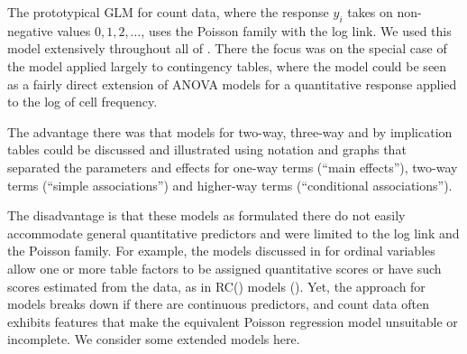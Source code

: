 \documentclass[11pt]{book}\usepackage[]{graphicx}\usepackage[]{color}
\begin{document}

The prototypical GLM for count data, where the response $y_i$
takes on non-negative values $0, 1, 2, \dots$,
uses the Poisson family with the log link.
We used this model extensively throughout all of .
There the focus was on the special case of the \loglin model
applied largely to contingency tables, where the \loglin model could
be seen as a fairly direct extension of ANOVA models for a
quantitative response applied to the log of cell frequency.

The advantage there was that models for two-way, three-way and
by implication \nway tables could be discussed and illustrated
using notation and graphs that separated the parameters and
effects for one-way terms (``main effects''), two-way terms
(``simple associations'') and higher-way terms (``conditional associations'').

The disadvantage is that these models as formulated there do not
easily accommodate general quantitative predictors and
were limited to the log link and the Poisson family.
For example, the models discussed in 
for ordinal variables allow one or more table factors to be
assigned quantitative scores or have such scores estimated from
the data, as in RC() models ().
Yet, the \ctab approach for \loglin models breaks down if there are
continuous predictors, and count data often exhibits features that
make the equivalent Poisson regression model unsuitable or incomplete.
We consider some extended models here.
\end{document}
